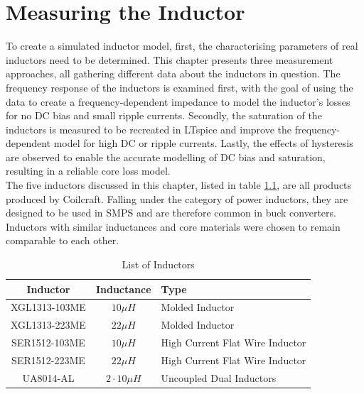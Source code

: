 \chapter{Measuring the Inductor} \label{sec:cha3}
To create a simulated inductor model, first, the characterising parameters of real inductors need to be determined. This chapter presents three measurement approaches, all gathering different data about the inductors in question. The frequency response of the inductors is examined first, with the goal of using the data to create a frequency-dependent impedance to model the inductor's losses for no \ac{DC} bias and small ripple currents. Secondly, the saturation of the inductors is measured to be recreated in LTspice and improve the frequency-dependent model for high \ac{DC} or ripple currents. Lastly, the effects of hysteresis are observed to enable the accurate modelling of \ac{DC} bias and saturation, resulting in a reliable core loss model.\\
The five inductors discussed in this chapter, listed in table \ref{tab:list_of_inductors}, are all products produced by Coilcraft. Falling under the category of power inductors, they are designed to be used in \ac{SMPS} and are therefore common in buck converters. Inductors with similar inductances and core materials were chosen to remain comparable to each other.
\begin{table}[H]
    \centering
    \caption{List of Inductors}
    \begin{tabular}{|c|c|l|}
    \hline
    Inductor &  Inductance & Type \\
    \hline
     XGL1313-103ME & $10 \mu H$ & Molded Inductor \\
        XGL1313-223ME & $22 \mu H$ & Molded Inductor \\
        SER1512-103ME & $10 \mu H$ & High Current Flat Wire Inductor \\
        SER1512-223ME & $22 \mu H$ & High Current Flat Wire Inductor \\
        UA8014-AL & $2 \cdot 10 \mu H$ & Uncoupled Dual Inductors \\
    \hline
    \end{tabular}
    \label{tab:list_of_inductors}
\end{table}


